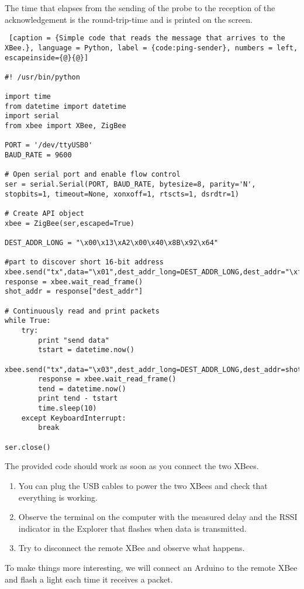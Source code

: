 The time that elapses from the sending of the probe to the reception of the acknowledgement is the round-trip-time and is printed on the screen.

\begin{lstlisting} [caption = {Simple code that reads the message that arrives to the XBee.}, language = Python, label = {code:ping-sender}, numbers = left, escapeinside={@}{@}]

#! /usr/bin/python

import time
from datetime import datetime
import serial
from xbee import XBee, ZigBee

PORT = '/dev/ttyUSB0'
BAUD_RATE = 9600

# Open serial port and enable flow control
ser = serial.Serial(PORT, BAUD_RATE, bytesize=8, parity='N', stopbits=1, timeout=None, xonxoff=1, rtscts=1, dsrdtr=1)

# Create API object
xbee = ZigBee(ser,escaped=True)

DEST_ADDR_LONG = "\x00\x13\xA2\x00\x40\x8B\x92\x64"

#part to discover short 16-bit address
xbee.send("tx",data="\x01",dest_addr_long=DEST_ADDR_LONG,dest_addr="\xff\xfe")
response = xbee.wait_read_frame()
shot_addr = response["dest_addr"]

# Continuously read and print packets
while True:
    try:
        print "send data"
        tstart = datetime.now()
        xbee.send("tx",data="\x03",dest_addr_long=DEST_ADDR_LONG,dest_addr=shot_addr)
        response = xbee.wait_read_frame()
        tend = datetime.now()
        print tend - tstart
        time.sleep(10)
    except KeyboardInterrupt:
        break

ser.close()

\end{lstlisting}

The provided code should work as soon as you connect the two XBees. 

\begin{enumerate}
 \item You can plug the USB cables to power the two XBees and check that everything is working.
 \item Observe the terminal on the computer with the measured delay and the RSSI indicator in the Explorer that flashes when data is transmitted.
 \item Try to disconnect the remote XBee and observe what happens.
\end{enumerate}

To make things more interesting, we will connect an Arduino to the remote XBee and flash a light each time it receives a packet.

